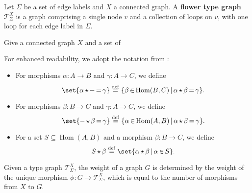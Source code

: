 \begin{definition}
    \label{def:t_sigm_x}
    Let $\Sigma$ be a set of edge labels and \( X \) a connected graph.
    A \textbf{flower type graph} \( \mathcal{T}_\Sigma^X \) is a graph comprising a single node \( v \) and a collection of loops on \( v \), with one loop for each edge label in \( \Sigma \).
\end{definition}
Give a connected graph $X$ and a set of 

\begin{remark}[Notation]
    For enhanced readability, we adopt the notation from \cite[Notation 3.3]{endrullis2023generalized}:
    \begin{itemize}
        \item For morphisms \( \alpha : A \mathop{\to} B \) and \( \gamma : A \mathop{\to} C \), we define
        \[
            \set{ \alpha \mathop{\star} - \mathop{=} \gamma } \overset{\operatorname{def}}{=} \{ \beta \mathop{\in} \operatorname{Hom}(B, C) \mathop{\mid} \alpha \mathop{\star} \beta \mathop{=} \gamma \}.
        \]
        \item For morphisms \( \beta : B \mathop{\to} C \) and \( \gamma : A \mathop{\to} C \), we define
        \[
            \set{ - \mathop{\star} \beta \mathop{=} \gamma } \overset{\operatorname{def}}{=} \{ \alpha \mathop{\in} \operatorname{Hom}(A, B) \mathop{\mid} \alpha \mathop{\star} \beta \mathop{=} \gamma \}.
        \]
        \item For a set \( S \mathop{\subseteq} \operatorname{Hom}(A, B) \) and a morphism \( \beta : B \mathop{\to} C \), we define
        \[
            S \mathop{\star} \beta \overset{\operatorname{def}}{=} \set{ \alpha \mathop{\star} \beta \mathop{\mid} \alpha \mathop{\in} S }.
        \]
    \end{itemize}
\end{remark}

Given a type graph \( \mathcal{T}_\Sigma^X\), the weight of a graph \( G \) is determined by the weight of the unique morphism \( \phi : G \mathop{\to} \mathcal{T}_\Sigma^X\), which is equal to the number of morphisms from \( X \) to \( G \).

